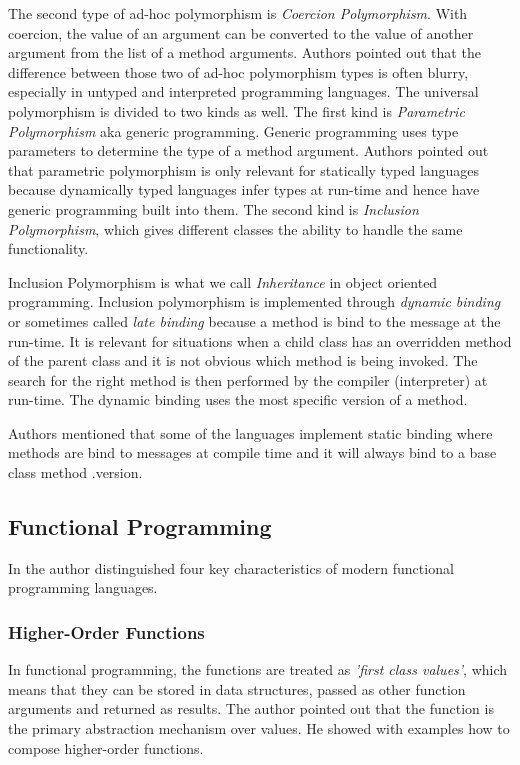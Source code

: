 \documentclass[12pt,twoside,a4paper]{report}
\begin{document}
The second type of ad-hoc polymorphism is \textit{Coercion Polymorphism}. With coercion, the value of an argument can be converted to the value of another argument from the list of a method arguments. Authors pointed out that the difference between those two of ad-hoc polymorphism types is often blurry, especially in untyped and interpreted programming languages. The universal polymorphism is divided to two kinds as well. The first kind is \textit{Parametric Polymorphism} aka generic programming. Generic programming uses type parameters to determine the type of a method argument. Authors pointed out that parametric polymorphism is only relevant for statically typed languages because dynamically typed languages infer types at run-time and hence have generic programming built into them. The second kind is \textit{Inclusion Polymorphism}, which gives different classes the ability to handle the same functionality.

Inclusion Polymorphism is what we call \textit{Inheritance} in object oriented programming. Inclusion polymorphism is implemented through \textit{dynamic binding} or sometimes called \textit{late binding} because a method is bind to the message at the run-time. It is relevant for situations when a child class has an overridden method of the parent class and it is not obvious which method is being invoked. The search for the right method is then performed by the compiler (interpreter) at run-time. The dynamic binding uses the most specific version of a method. 

Authors mentioned that some of the languages implement static binding where methods are bind to messages at compile time and it will always bind to a base class method .version.

\subsection{Functional Programming}
In \cite{12} the author distinguished four key characteristics of modern functional programming languages.

\subsubsection{Higher-Order Functions}
In functional programming, the functions are treated as \textit{'first class values'}, which means that they can be stored in data structures, passed as other function arguments and returned as results. The author pointed out that the function is the primary abstraction mechanism over values. He showed with examples how to compose higher-order functions.
\end{document}
